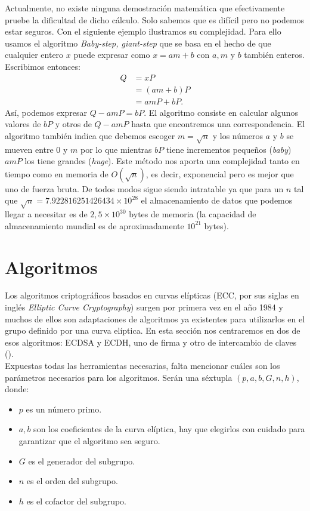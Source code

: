 \documentclass[11pt]{article}
\begin{document}
Actualmente, no existe ninguna demostración matemática que efectivamente pruebe la dificultad de dicho cálculo. Solo sabemos que es difícil pero no podemos estar seguros. Con el siguiente ejemplo ilustramos su complejidad. Para ello usamos el algoritmo \textit{Baby-step, giant-step} que se basa en el hecho de que cualquier entero $ x $ puede expresar como $ x = am+b $ con $ a,m \text{ y } b$ también enteros. Escribimos entonces:
\begin{equation*}
\begin{split}
Q &= xP \\
  &= (am+b)P\\
  &=amP + bP.
\end{split}
\end{equation*}
Así, podemos expresar $ Q - amP  = bP $. El algoritmo consiste en calcular algunos valores de $ bP $ y otros de $ Q-amP $ hasta que encontremos una correspondencia. El algoritmo también indica que debemos escoger $ m = \sqrt{n} $ y los números $ a $ y $ b $ se mueven entre 0 y $ m $ por lo que mientras $ bP $ tiene incrementos pequeños (\textit{baby}) $ amP $ los tiene grandes (\textit{huge}). Este método nos aporta una complejidad tanto en tiempo como en memoria de $ O(\sqrt{n}) $, es decir, exponencial pero es mejor que uno de fuerza bruta. De todos modos sigue siendo intratable ya que para un $  n  $ tal que $ \sqrt{n} = 7.922816251426434 \times 10^{28} $ el almacenamiento de datos que podemos llegar a necesitar es de $ 2,5\times10^{30} $ bytes de memoria (la capacidad de almacenamiento mundial es de aproximadamente $ 10^{21} $ bytes). \\

\section{Algoritmos}
\label{sec:alg}
Los algoritmos criptográficos basados en curvas elípticas (ECC, por sus siglas en inglés \textit{Elliptic Curve Cryptography}) surgen por primera vez en el año 1984 y muchos de ellos son adaptaciones de algoritmos ya existentes para utilizarlos en el grupo definido por una curva elíptica. En esta sección nos centraremos en dos de esos algoritmos: ECDSA y ECDH, uno de firma y otro de intercambio de claves (\cite{noauthor_elliptic_nodate}).\\

Expuestas todas las herramientas necesarias, falta mencionar cuáles son los parámetros necesarios para los algoritmos. Serán una séxtupla $ (p, a, b, G, n, h) $, donde:
\begin{itemize}
	\item $ p $ es un número primo.
	\item $ a, b $ son los coeficientes de la curva elíptica, hay que elegirlos con cuidado para garantizar que el algoritmo sea seguro.
	\item $ G $ es el generador del subgrupo.
	\item $ n $ es el orden del subgrupo.
	\item $ h $ es el cofactor del subgrupo.
\end{itemize}
\end{document}
